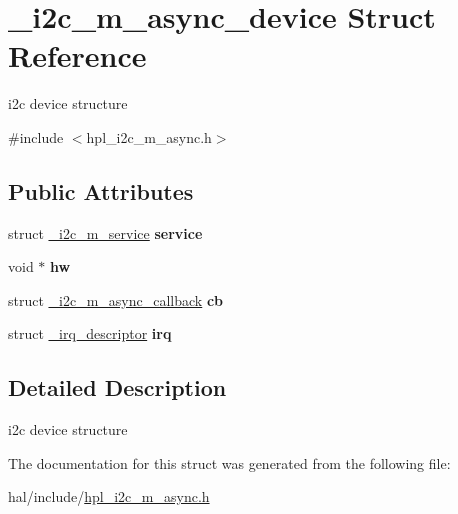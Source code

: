 \hypertarget{struct__i2c__m__async__device}{}\section{\+\_\+i2c\+\_\+m\+\_\+async\+\_\+device Struct Reference}
\label{struct__i2c__m__async__device}


i2c device structure  




{\ttfamily \#include $<$hpl\+\_\+i2c\+\_\+m\+\_\+async.\+h$>$}

\subsection*{Public Attributes}
\begin{DoxyCompactItemize}
\item 
\mbox{\label{struct__i2c__m__async__device_af5f859bdc41f7e259b0486f07f15ba64}} 
struct \hyperlink{struct__i2c__m__service}{\+\_\+i2c\+\_\+m\+\_\+service} {\bfseries service}
\item 
\mbox{\label{struct__i2c__m__async__device_a8b2ab2555cc4e329a014a3dcee9bc426}} 
void $\ast$ {\bfseries hw}
\item 
\mbox{\label{struct__i2c__m__async__device_a83cd050cbba8adb3a0ceeffc52eca170}} 
struct \hyperlink{struct__i2c__m__async__callback}{\+\_\+i2c\+\_\+m\+\_\+async\+\_\+callback} {\bfseries cb}
\item 
\mbox{\label{struct__i2c__m__async__device_ab0c2fd3fe8bd5adac55a19fdf6b27766}} 
struct \hyperlink{struct__irq__descriptor}{\+\_\+irq\+\_\+descriptor} {\bfseries irq}
\end{DoxyCompactItemize}


\subsection{Detailed Description}
i2c device structure 

The documentation for this struct was generated from the following file\+:\begin{DoxyCompactItemize}
\item 
hal/include/\hyperlink{hpl__i2c__m__async_8h}{hpl\+\_\+i2c\+\_\+m\+\_\+async.\+h}\end{DoxyCompactItemize}
